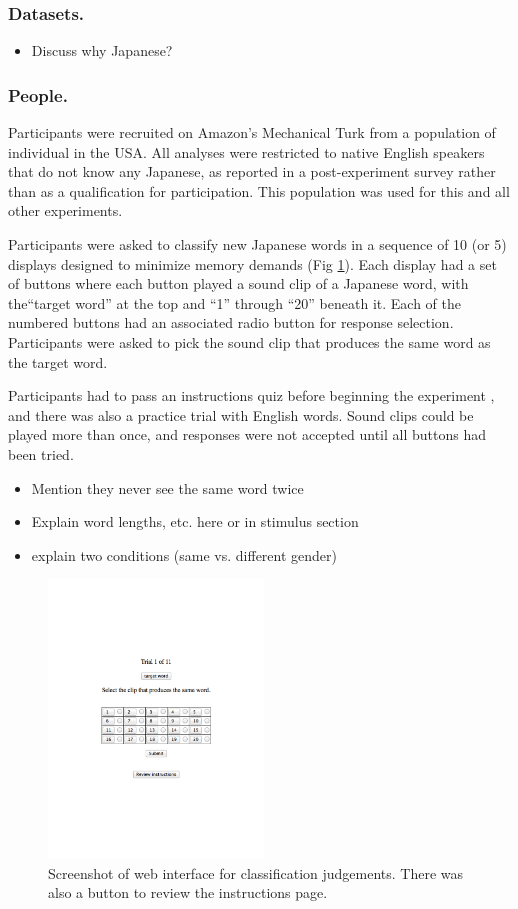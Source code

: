 \documentclass[10pt,letterpaper]{article}
\begin{document}
\subsubsection{Datasets.} 

\begin{itemize}
\item Discuss why Japanese?
\end{itemize}

\subsubsection{People.}
Participants were recruited on Amazon's Mechanical Turk from a population of individual in the USA. All analyses were restricted to native English speakers that do not know any Japanese, as reported in a post-experiment survey rather than as a qualification for participation. This population was used for this and all other experiments. 

Participants were asked to classify new Japanese words in a sequence of 10 (or 5) displays designed to minimize memory demands (Fig \ref{ss}). Each display had a set of buttons where each button played a sound clip of a Japanese word, with the``target word'' at the top and ``1'' through ``20'' beneath it. Each of the numbered buttons had an associated radio button for response selection. Participants were asked to pick the sound clip that produces the same word as the target word.

Participants had to pass an instructions quiz before beginning the experiment \cite{Crump2013}, and there was also a practice trial with English words. Sound clips could be played more than once, and responses were not accepted until all buttons had been tried. 

\begin{itemize}
\item Mention they never see the same word twice
\item Explain word lengths, etc. here or in stimulus section
\item explain two conditions (same vs. different gender)
\end{itemize}

\begin{figure}[h]
\centering
\includegraphics[width=2.25in]{web_exp.pdf}
\caption{Screenshot of web interface for classification judgements. There was also a button to review the instructions page.}
\label{ss}
\end{figure}
\end{document}
